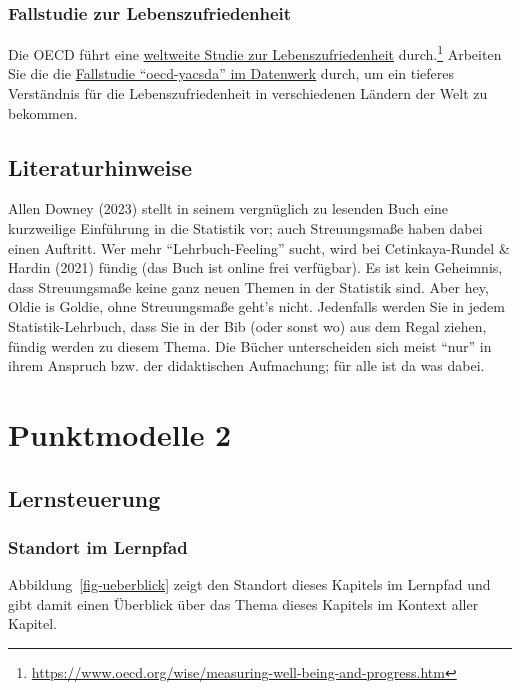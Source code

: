 \documentclass[
  a4paper,
]{scrbook}
\theoremstyle{definition}
\theoremstyle{definition}
\theoremstyle{definition}
\theoremstyle{remark}
\begin{document}
\subsection{Fallstudie zur
Lebenszufriedenheit}\label{fallstudie-zur-lebenszufriedenheit}

Die OECD führt eine
\href{https://www.oecd.org/wise/measuring-well-being-and-progress.htm}{weltweite
Studie zur Lebenszufriedenheit} durch.\footnote{\url{https://www.oecd.org/wise/measuring-well-being-and-progress.htm}}
Arbeiten Sie die die
\href{https://datenwerk.netlify.app/posts/oecd-yacsda/}{Fallstudie
``oecd-yacsda'' im Datenwerk} durch, um ein tieferes Verständnis für die
Lebenszufriedenheit in verschiedenen Ländern der Welt zu bekommen.

\section{Literaturhinweise}\label{literaturhinweise-4}

Allen Downey (2023) stellt in seinem vergnüglich zu lesenden Buch eine
kurzweilige Einführung in die Statistik vor; auch Streuungsmaße haben
dabei einen Auftritt. Wer mehr ``Lehrbuch-Feeling'' sucht, wird bei
Cetinkaya-Rundel \& Hardin (2021) fündig (das Buch ist online frei
verfügbar). Es ist kein Geheimnis, dass Streuungsmaße keine ganz neuen
Themen in der Statistik sind. Aber hey, Oldie is Goldie, ohne
Streuungsmaße geht's nicht. Jedenfalls werden Sie in jedem
Statistik-Lehrbuch, dass Sie in der Bib (oder sonst wo) aus dem Regal
ziehen, fündig werden zu diesem Thema. Die Bücher unterscheiden sich
meist ``nur'' in ihrem Anspruch bzw. der didaktischen Aufmachung; für
alle ist da was dabei.

\chapter{Punktmodelle 2}\label{sec-zusammenhaenge}

\section{Lernsteuerung}\label{lernsteuerung-6}

\subsection{Standort im Lernpfad}\label{standort-im-lernpfad}

Abbildung~\ref{fig-ueberblick} zeigt den Standort dieses Kapitels im
Lernpfad und gibt damit einen Überblick über das Thema dieses Kapitels
im Kontext aller Kapitel.
\end{document}
